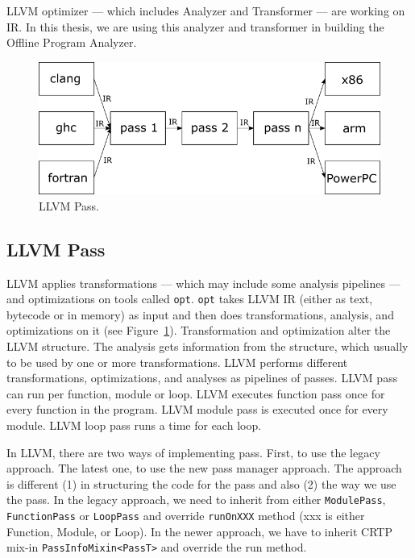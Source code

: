 LLVM optimizer --- which includes Analyzer and Transformer --- are working on
IR. In this thesis, we are using this analyzer and transformer in building the
Offline Program Analyzer.

\begin{figure}[htbp] 
    \centerline{\includegraphics[scale=.75]{Figures/03/llvm-overview.png}} 
    \caption{LLVM Pass.} 
    \label{fig:llvm} 
\end{figure} 

\subsection{LLVM Pass}
\label{subsec:llvm-pass}

LLVM applies transformations --- which may include some analysis pipelines ---
and optimizations on tools called \texttt{opt}. \texttt{opt} takes LLVM IR
(either as text, bytecode or in memory) as input and then does transformations,
analysis, and optimizations on it (see Figure~\ref{fig:llvm}). Transformation
and optimization alter the LLVM structure. The analysis gets information from
the structure, which usually to be used by one or more transformations. LLVM
performs different transformations, optimizations, and analyses as pipelines of
passes. LLVM pass can run per function, module or loop. LLVM executes function
pass once for every function in the program. LLVM module pass is executed once
for every module. LLVM loop pass runs a time for each loop.  


In LLVM, there are two ways of implementing pass. First, to use the legacy
approach. The latest one, to use the new pass manager approach. The approach is
different (1) in structuring the code for the pass and also (2) the way we use
the pass. In the legacy approach, we need to inherit from either
\texttt{ModulePass}, \texttt{FunctionPass} or \texttt{LoopPass} and override
\texttt{runOnXXX} method (xxx is either Function, Module, or Loop). In the newer
approach, we have to inherit CRTP mix-in \texttt{PassInfoMixin<PassT>} and
override the run method.

